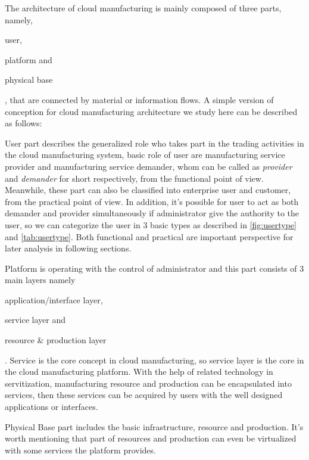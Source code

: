 The architecture of cloud manufacturing is mainly composed of three parts, namely, \begin{inparaenum}[1)]
\item user,
\item platform and
\item physical base
\end{inparaenum}, that are connected by material or information flows. A simple version of conception for cloud manufacturing architecture we study here can be described as follows:
\begin{compactdesc}
\item [User] part describes the generalized role who takes part in the trading activities in the cloud manufacturing system, basic role of user are manufacturing service provider and manufacturing service demander, whom can be called as \textit{provider} and \textit{demander} for short respectively, from the functional point of view. Meanwhile, these part can also be classified into enterprise user and customer, from the practical point of view. In addition, it's possible for user to act as both demander and provider simultaneously if administrator give the authority to the user, so we can categorize the user in 3 basic types as described in \autoref{fig:usertype} and \autoref{tab:usertype}. Both functional and practical are important perspective for later analysis in following sections.
\item [Platform] is operating with the control of administrator and this part consists of 3 main layers namely
	\begin{inparaenum}[1)]
	\item application/interface layer,
	\item service layer and
	\item resource \& production layer
	\end{inparaenum}.
Service is the core concept in cloud manufacturing, so service layer is the core in the cloud manufacturing platform. With the help of related technology in servitization, manufacturing resource and production can be encapsulated into services, then these services can be acquired by users with the well designed applications or interfaces.
\item [Physical Base] part includes the basic infrastructure, resource and production. It's worth mentioning that part of resources and production can even be virtualized with some services the platform provides.
\end{compactdesc}


